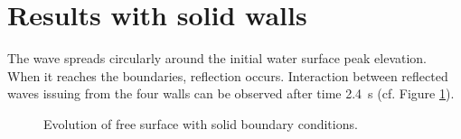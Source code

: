 \section{Results with solid walls}

The wave spreads circularly around the initial water surface peak elevation.
When it reaches the boundaries, reflection occurs.
Interaction between reflected waves issuing from the four walls can be
observed after time 2.4~s (cf. Figure \ref{t2d:gouttedo:walls_evol}).

\begin{figure}[H]
\begin{minipage}[t]{0.50\textwidth}
 \centering
\end{minipage}
\begin{minipage}[t]{0.50\textwidth}
 \centering
\end{minipage}
\begin{minipage}[t]{0.50\textwidth}
 \centering
\end{minipage}
\begin{minipage}[t]{0.50\textwidth}
 \centering
\end{minipage}
\begin{minipage}[t]{0.50\textwidth}
 \centering
\end{minipage}
\begin{minipage}[t]{0.50\textwidth}
 \centering
\end{minipage}
\begin{minipage}[t]{0.50\textwidth}
 \centering
\end{minipage}
\begin{minipage}[t]{0.50\textwidth}
 \centering
\end{minipage}
\caption{Evolution of free surface with solid boundary conditions.}
\label{t2d:gouttedo:walls_evol}
\end{figure}

